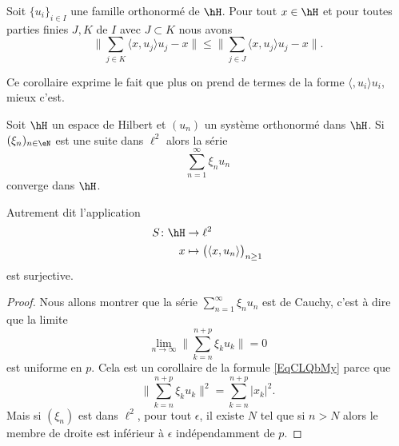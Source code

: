\begin{corollary}
    Soit \( \{ u_i \}_{i\in I}\) une famille orthonormé de \( \hH\). Pour tout \( x\in \hH\) et pour toutes parties finies \( J,K\) de \( I\) avec \( J\subset K\) nous avons
    \begin{equation}
        \| \sum_{j\in K}\langle x, u_j\rangle u_j-x \|\leq \| \sum_{j\in J}\langle x, u_j\rangle u_j-x \|.
    \end{equation}
\end{corollary}
Ce corollaire exprime le fait que plus on prend de termes de la forme \( \langle , u_i\rangle u_i\), mieux c'est.

\begin{proposition}     \label{PropzaKXHq}
    Soit \( \hH\) un espace de Hilbert et \( (u_n)\) un système orthonormé dans \( \hH\). Si \( (\xi_n)_{n\in \eN}\) est une suite dans \( \ell^2\) alors la série
    \begin{equation}
        \sum_{n=1}^{\infty}\xi_nu_n
    \end{equation}
    converge dans \( \hH\).

    Autrement dit l'application
    \begin{equation}
        \begin{aligned}
            S\colon \hH&\to \ell^2 \\
            x&\mapsto \big( \langle x, u_n\rangle  \big)_{n\geq 1}
        \end{aligned}
    \end{equation}
    est surjective.
\end{proposition}

\begin{proof}
    Nous allons montrer que la série \( \sum_{n=1}^{\infty}\xi_nu_n\) est de Cauchy, c'est à dire que la limite
    \begin{equation}
        \lim_{n\to \infty} \big\| \sum_{k=n}^{n+p}\xi_ku_k \big\|=0
    \end{equation}
    est uniforme en \( p\). Cela est un corollaire de la formule \eqref{EqCLQbMy} parce que
    \begin{equation}
        \big\| \sum_{k=n}^{n+p}\xi_ku_k \big\|^2=\sum_{k=n}^{n+p}| x_k |^2.
    \end{equation}
    Mais si \( (\xi_n)\) est dans \( \ell^2\), pour tout \( \epsilon\), il existe \( N\) tel que si \( n>N\) alors le membre de droite est inférieur à \( \epsilon\) indépendamment de \( p\).
\end{proof}

